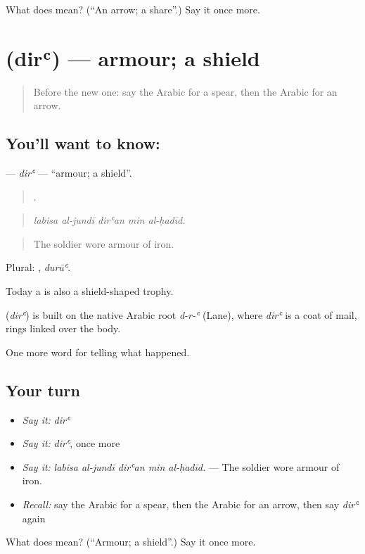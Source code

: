 \begin{tcolorbox}[breakable,colback=teal!4,colframe=teal!35!black,title={Before you move on}]
What does  mean? (\textquotedblleft{}An arrow; a share\textquotedblright{}.) Say it once more.
\end{tcolorbox}
\section[\texorpdfstring{\ar{درع} (dirʿ)}{درع (dirʿ)}]{ (dirʿ) — armour; a shield}

\label{lesson:AR-C326-dir}



\begin{quote}
Before the new one: say the Arabic for a spear, then the Arabic for an arrow.
\end{quote}

\subsection*{You'll want to know: }
\textbf{} — \emph{dirʿ} — \textquotedblleft{}armour; a shield\textquotedblright{}.

\begin{quote}
    .
\end{quote}

\begin{quote}
\emph{labisa al-jundī dirʿan min al-ḥadīd.}
\end{quote}

\begin{quote}
The soldier wore armour of iron.
\end{quote}

Plural: , \emph{durūʿ}.

Today a  is also a shield-shaped trophy.

\begin{cousinweb}
\textbf{} (\emph{dirʿ}) is built on the native Arabic root \emph{d-r-ʿ} (Lane), where \emph{dirʿ} is a coat of mail, rings linked over the body.
\end{cousinweb}

\begin{grammarlens}[title={What you've built}]
One more word for telling what happened.
\end{grammarlens}

\subsection*{Your turn}
\begin{itemize}
\raggedright
  \item \emph{Say it:} \emph{dirʿ}
  \item \emph{Say it:} \emph{dirʿ}, once more
  \item \emph{Say it:} \emph{labisa al-jundī dirʿan min al-ḥadīd.} — The soldier wore armour of iron.
  \item \emph{Recall:} say the Arabic for a spear, then the Arabic for an arrow, then say \emph{dirʿ} again
\end{itemize}

\begin{tcolorbox}[breakable,colback=teal!4,colframe=teal!35!black,title={Before you move on}]
What does  mean? (\textquotedblleft{}Armour; a shield\textquotedblright{}.) Say it once more.
\end{tcolorbox}
